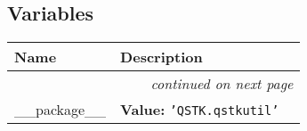 
  \subsection{Variables}

    \vspace{-1cm}
\hspace{\varindent}\begin{longtable}{|p{\varnamewidth}|p{\vardescrwidth}|l}
\cline{1-2}
\cline{1-2} \centering \textbf{Name} & \centering \textbf{Description}& \\
\cline{1-2}
\endhead\cline{1-2}\multicolumn{3}{r}{\small\textit{continued on next page}}\\\endfoot\cline{1-2}
\endlastfoot\raggedright \_\-\_\-p\-a\-c\-k\-a\-g\-e\-\_\-\_\- & \raggedright \textbf{Value:} 
{\tt \texttt{'}\texttt{QSTK.qstkutil}\texttt{'}}&\\
\cline{1-2}
\end{longtable}

